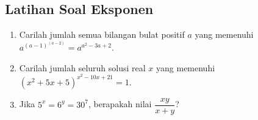 \subsection{Latihan Soal Eksponen}
\begin{enumerate}
    \item Carilah jumlah semua bilangan bulat positif $a$ yang memenuhi $a^{(a-1)^{(a-2)}}=a^{a^2-3a+2}$.
    
    \item Carilah jumlah seluruh solusi real $x$ yang memenuhi $(x^2+5x+5)^{x^2-10x+21}=1.$
    
    \item Jika $5^x=6^y=30^7$, berapakah nilai $\dfrac{xy}{x+y}$?
\end{enumerate}